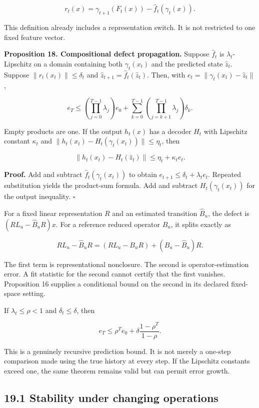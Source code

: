 \[
r_t(x)=\gamma_{t+1}(F_t(x))-\widehat f_t(\gamma_t(x)).
\]

This definition already includes a representation switch. It is not
restricted to one fixed feature vector.

\textbf{Proposition 18. Compositional defect propagation.} Suppose
\(\widehat f_t\) is \(\lambda_t\)-Lipschitz on a domain containing both
\(\gamma_t(x_t)\) and the predicted state \(\widehat z_t\). Suppose
\(\|r_t(x_t)\|\leq\delta_t\) and
\(\widehat z_{t+1}=\widehat f_t(\widehat z_t)\). Then, with
\(e_t=\|\gamma_t(x_t)-\widehat z_t\|\),

\[
\boxed{
e_T\leq
\left(\prod_{j=0}^{T-1}\lambda_j\right)e_0
+\sum_{k=0}^{T-1}
\left(\prod_{j=k+1}^{T-1}\lambda_j\right)\delta_k.
}
\]

Empty products are one. If the output \(h_t(x)\) has a decoder \(H_t\)
with Lipschitz constant \(\kappa_t\) and
\(\|h_t(x_t)-H_t(\gamma_t(x_t))\|\leq\eta_t\), then

\[
\|h_t(x_t)-H_t(\widehat z_t)\|
\leq\eta_t+\kappa_te_t.
\]

\textbf{Proof.} Add and subtract \(\widehat f_t(\gamma_t(x_t))\) to
obtain \(e_{t+1}\leq\delta_t+\lambda_te_t\). Repeated substitution
yields the product-sum formula. Add and subtract \(H_t(\gamma_t(x_t))\)
for the output inequality. \(\square\)

For a fixed linear representation \(R\) and an estimated transition
\(\widehat B_u\), the defect is \((RL_u-\widehat B_uR)x\). For a
reference reduced operator \(B_u\), it splits exactly as

\[
RL_u-\widehat B_uR
=(RL_u-B_uR)+(B_u-\widehat B_u)R.
\]

The first term is representational nonclosure. The second is
operator-estimation error. A fit statistic for the second cannot certify
that the first vanishes. Proposition 16 supplies a conditional bound on
the second in its declared fixed-space setting.

If \(\lambda_t\leq\rho<1\) and \(\delta_t\leq\delta\), then

\[
e_T\leq\rho^Te_0+\delta\frac{1-\rho^T}{1-\rho}.
\]

This is a genuinely recursive prediction bound. It is not merely a
one-step comparison made using the true history at every step. If the
Lipschitz constants exceed one, the same theorem remains valid but can
permit error growth.

\subsection{19.1 Stability under changing
operations}\label{LSM:stability-under-changing-operations}

